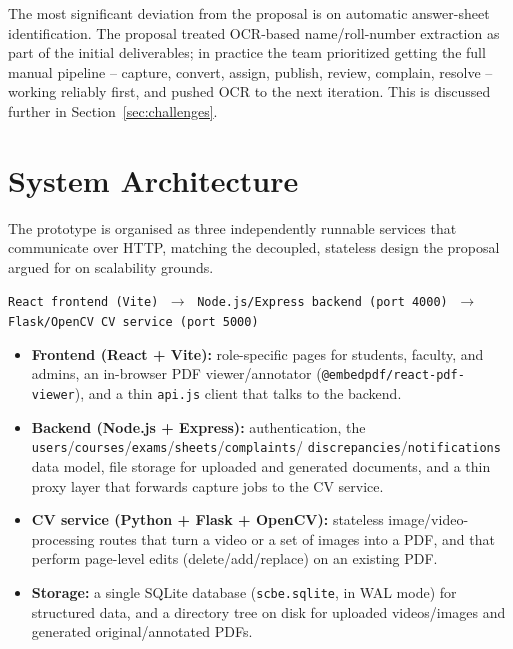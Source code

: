 \documentclass[11pt,a4paper]{article}
\begin{document}
The most significant deviation from the proposal is on automatic
answer-sheet identification. The proposal treated OCR-based name/roll-number
extraction as part of the initial deliverables; in practice the team
prioritized getting the full manual pipeline -- capture, convert, assign,
publish, review, complain, resolve -- working reliably first, and pushed OCR
to the next iteration. This is discussed further in Section~\ref{sec:challenges}.

\section{System Architecture}

The prototype is organised as three independently runnable services that
communicate over HTTP, matching the decoupled, stateless design the proposal
argued for on scalability grounds.

\begin{center}
\texttt{React frontend (Vite)} $\;\longrightarrow\;$
\texttt{Node.js/Express backend (port 4000)} $\;\longrightarrow\;$
\texttt{Flask/OpenCV CV service (port 5000)}
\end{center}

\begin{itemize}[leftmargin=0.7cm]
  \item \textbf{Frontend (React + Vite):} role-specific pages for students,
    faculty, and admins, an in-browser PDF viewer/annotator
    (\texttt{@embedpdf/react-pdf-viewer}), and a thin \texttt{api.js} client
    that talks to the backend.
  \item \textbf{Backend (Node.js + Express):} authentication, the
    \texttt{users}/\texttt{courses}/\texttt{exams}/\texttt{sheets}/\texttt{complaints}/
    \texttt{discrepancies}/\texttt{notifications} data model, file storage for
    uploaded and generated documents, and a thin proxy layer that forwards
    capture jobs to the CV service.
  \item \textbf{CV service (Python + Flask + OpenCV):} stateless
    image/video-processing routes that turn a video or a set of images into a
    PDF, and that perform page-level edits (delete/add/replace) on an existing
    PDF.
  \item \textbf{Storage:} a single SQLite database (\texttt{scbe.sqlite}, in
    WAL mode) for structured data, and a directory tree on disk for uploaded
    videos/images and generated original/annotated PDFs.
\end{itemize}
\end{document}
